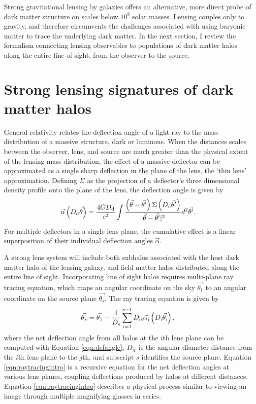 Strong gravitational lensing by galaxies offers an alternative, more direct probe of dark matter structure on scales below $10^8$ solar masses. Lensing couples only to gravity, and therefore circumvents the challenges associated with using baryonic matter to trace the underlying dark matter. In the next section, I review the formalism connecting lensing observables to populations of dark matter halos along the entire line of sight, from the observer to the source. 

\section{Strong lensing signatures of dark matter halos}
\indent General relativity relates the deflection angle of a light ray to the mass distribution of a massive structure, dark or luminous. When the distances scales between the observer, lens, and source are much greater than the physical extent of the lensing mass distribution, the effect of a massive deflector can be approximated as a single sharp deflection in the plane of the lens, the `thin lens' approximation. Defining $\Sigma$ as the projection of a deflector's three dimensional density profile onto the plane of the lens, the deflection angle is given by \cite{BlandfordNarayan86,Schnedier1997}
\begin{equation}
\label{eqn:defangle}
\vec{\alpha}\left(D_{\rm{d}} \vec{\theta}\right) = \frac{4G D_{\rm{d}}}{c^2} \int \frac{\left(\vec{\theta} - \vec{\theta}^{\prime}\right) \Sigma\left(D_{\rm{d}}\vec{\theta}^{\prime}\right)}{|\vec{\theta} - \vec{\theta}^{\prime}|^2} d^2 \vec{\theta^{\prime}}. 
\end{equation}
For multiple deflectors in a single lens plane, the cumulative effect is a linear superposition of their individual deflection angles $\vec{\alpha}$. 

A strong lens system will include both subhalos associated with the host dark matter halo of the lensing galaxy, and field matter halos distributed along the entire line of sight. Incorporating line of sight halos requires multi-plane ray tracing equation, which maps an angular coordinate on the sky $\vec{\theta_1}$ to an angular coordinate on the source plane $\vec{\theta_s}$. The ray tracing equation is given by \cite{BlandfordNarayan86}
\begin{equation}
\label{eqn:raytracingintro}
\vec{\theta_s} = \vec{\theta_1} - \frac{1}{D_{\rm{s}}} \sum_{i=1}^{s-1} D_{\rm{is}}{\vec{\alpha_{\rm{i}}}} \left(D_{\rm{i}} \vec{\theta_{\rm{i}}}\right),
\end{equation} 
where the net deflection angle from all halos at the $i$th lens plane can be computed with Equation \ref{eqn:defangle}, $D_{\rm{ij}}$ is the angular diameter distance from the $i$th lens plane to the $j$th, and subscript $s$ identifies the source plane. Equation \ref{eqn:raytracingintro} is a recursive equation for the net deflection angles at various lens planes, coupling deflections produced by halos at different distances. Equation \ref{eqn:raytracingintro} describes a physical process similar to viewing an image through multiple magnifying glasses in series. 

